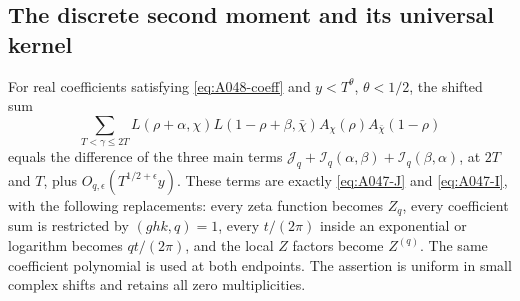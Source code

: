 \subsection*{The discrete second moment and its universal kernel}

\begin{lemma}
\label{lem:A048-discrete-second}
For real coefficients satisfying \eqref{eq:A048-coeff}
and \(y<T^\theta\), \(\theta<1/2\), the shifted sum
\[
 \sum_{T<\gamma\le2T}
 L(\rho+\alpha,\chi)L(1-\rho+\beta,\bar\chi)
             A_\chi(\rho)A_{\bar\chi}(1-\rho)
\]
equals the difference of the three main terms
\(\mathcal J_q+\mathcal I_q(\alpha,\beta)
+\mathcal I_q(\beta,\alpha)\), at \(2T\) and \(T\),
plus \(O_{q,\epsilon}(T^{1/2+\epsilon}y)\).
These terms are exactly \eqref{eq:A047-J} and
\eqref{eq:A047-I}, with the following replacements:
every zeta function becomes \(Z_q\), every coefficient
sum is restricted by \((ghk,q)=1\), every \(t/(2\pi)\)
inside an exponential or logarithm becomes \(qt/(2\pi)\),
and the local \(Z\) factors become \(Z^{(q)}\).
The same coefficient polynomial is used at both endpoints.
The assertion is uniform in small complex shifts and
retains all zero multiplicities.
\end{lemma}

